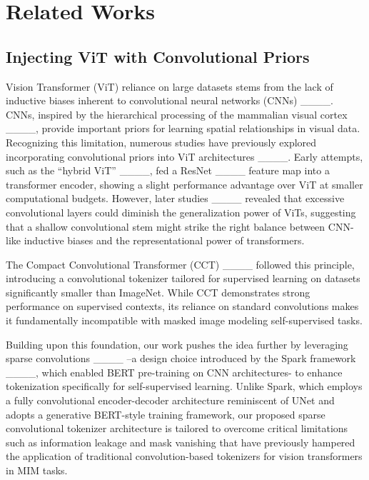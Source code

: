 \section{Related Works}
\subsection{Injecting ViT with Convolutional Priors}
Vision Transformer (ViT) reliance on large datasets stems from the lack of inductive biases inherent to convolutional neural networks (CNNs) ____. CNNs, inspired by the hierarchical processing of the mammalian visual cortex ____, provide important priors for learning spatial relationships in visual data. Recognizing this limitation, numerous studies have previously explored incorporating convolutional priors into ViT architectures ____. Early attempts, such as the “hybrid ViT” ____, fed a ResNet ____ feature map into a transformer encoder, showing a slight performance advantage over ViT at smaller computational budgets. However, later studies ____ revealed that excessive convolutional layers could diminish the generalization power of ViTs, suggesting that a shallow convolutional stem might strike the right balance between CNN-like inductive biases and the representational power of transformers.

The Compact Convolutional Transformer (CCT) ____ followed this principle, introducing a convolutional tokenizer tailored for supervised learning on datasets significantly smaller than ImageNet. While CCT demonstrates strong performance on supervised contexts, its reliance on standard convolutions makes it fundamentally incompatible with masked image modeling self-supervised tasks. 

Building upon this foundation, our work pushes the idea further by leveraging sparse convolutions ____ –a design choice introduced by the Spark framework ____, which enabled BERT pre-training on CNN architectures- to enhance tokenization specifically for self-supervised learning. Unlike Spark, which employs a fully convolutional encoder-decoder architecture reminiscent of UNet and adopts a generative BERT-style training framework, our proposed sparse convolutional tokenizer architecture is tailored to overcome critical limitations such as information leakage and mask vanishing that have previously hampered the application of traditional convolution-based tokenizers for vision transformers in MIM tasks.

